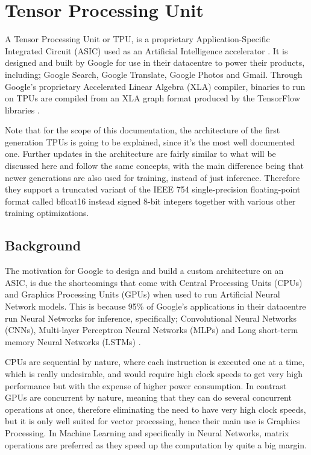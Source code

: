 \chapter[Tensor Processing Unit]{Tensor Processing Unit}
\label{ch:tensor-processing-unit}
A Tensor Processing Unit or TPU, is a proprietary Application-Specific Integrated Circuit (ASIC) used as an Artificial Intelligence accelerator \citep{jouppi2017datacenter}. It is designed and built by Google for use in their datacentre to power their products, including; Google Search, Google Translate, Google Photos and Gmail. Through Google's proprietary Accelerated Linear Algebra (XLA) compiler, binaries to run on TPUs are compiled from an XLA graph format produced by the TensorFlow libraries \citep{google}. 

Note that for the scope of this documentation, the architecture of the first generation TPUs is going to be explained, since it's the most well documented one. Further updates in the architecture are fairly similar to what will be discussed here and follow the same concepts, with the main difference being that newer generations are also used for training, instead of just inference. Therefore they support a truncated variant of the IEEE 754 single-precision floating-point format called bfloat16 instead signed 8-bit integers together with various other training optimizations.

\section{Background}\label{sec:background}

The motivation for Google to design and build a custom architecture on an ASIC, is due the shortcomings that come with Central Processing Units (CPUs) and Graphics Processing Units (GPUs) when used to run Artificial Neural Network models. This is because 95\% of Google's applications in their datacentre run Neural Networks for inference, specifically; Convolutional Neural Networks (CNNs), Multi-layer Perceptron Neural Networks (MLPs) and Long short-term memory Neural Networks (LSTMs) \citep{jouppi2017datacenter}. 

CPUs are sequential by nature, where each instruction is executed one at a time, which is really undesirable, and would require high clock speeds to get very high performance but with the expense of higher power consumption. In contrast GPUs are concurrent by nature, meaning that they can do several concurrent operations at once, therefore eliminating the need to have very high clock speeds, but it is only well suited for vector processing, hence their main use is Graphics Processing. In Machine Learning and specifically in Neural Networks, matrix operations are preferred as they speed up the computation by quite a big margin\citep{sato}.

